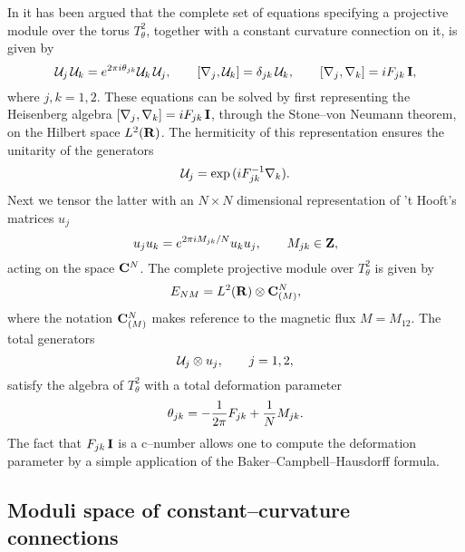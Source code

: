 \documentclass[a4paper,a4paper]{article}
\begin{document}
In \cite{KONECHNYSCHWARZ} it has been argued that the complete set  
of equations specifying a projective module over the torus $T_{\theta}^{2}$, 
together with a constant curvature connection on it, is given by  
\begin{equation}  
{\cal U}_j\,{\cal U}_k=e^{2\pi i\theta_{jk}}{\cal U}_k\,{\cal U}_j,\qquad  
\left[\nabla_j, {\cal U}_k\right]=\delta_{jk}\,{\cal U}_k,\qquad  
\left[\nabla_j,\nabla_k\right]=iF_{jk}\,{\bf  I},  
\label{konsch}
\end{equation}  
where $j,k=1,2$. These equations can be solved by first representing  
the Heisenberg algebra  
$\left[\nabla_j,\nabla_k\right]=iF_{jk}\,{\bf  I}$, through the  
Stone--von Neumann theorem, on the Hilbert space $L^2({\bf R})$. 
The hermiticity of this representation ensures the unitarity of the generators 
\begin{equation}
{\cal U}_j={\rm exp}\,(iF^{-1}_{jk}\nabla_k).
\label{genecalu}
\end{equation}
Next we tensor the latter with an $N\times N$ dimensional representation of  
't Hooft's matrices $u_j$  
\begin{equation}  
u_ju_k=e^{2\pi i M_{jk}/N}u_ku_j,\qquad M_{jk}\in{\bf Z},  
\label{thoftmat}
\end{equation}  
acting on the space ${\bf C}^N$. The complete projective module over 
$T_{\theta}^{2}$ is given by
\begin{equation}
E_{NM}=L^2({\bf R})\otimes {\bf C}^N_{(M)},
\label{totamod}
\end{equation}
where the notation ${\bf C}^N_{(M)}$ makes reference to the magnetic flux 
$M=M_{12}$.  The total generators 
\begin{equation}
{\cal U}_j\otimes u_j, \qquad j=1,2,
\label{turuturu}
\end{equation}
satisfy the algebra of $T_{\theta}^{2}$ with a total deformation 
parameter
\begin{equation}
\theta_{jk}=-{1\over 2\pi } F_{jk} + {1\over N}M_{jk}.
\label{totdefpara}
\end{equation}
The fact that $F_{jk}\,{\bf  I}$ is a c--number allows one to compute 
the deformation parameter by a simple application of
the Baker--Campbell--Hausdorff formula.  
  
\subsection{Moduli space of constant--curvature connections}\label{modspace}  
  
\end{document}
